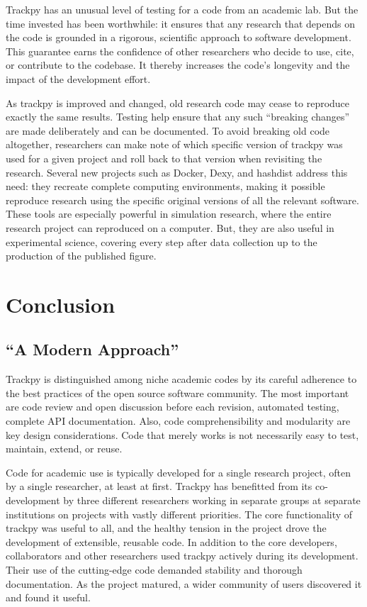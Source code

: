 Trackpy has an unusual level of testing for a code from an academic lab. But the time invested has been worthwhile: it ensures that any research that depends on the code is grounded in a rigorous, scientific approach to software development. This guarantee earns the confidence of other researchers who decide to use, cite, or contribute to the codebase. It thereby increases the code's longevity and the impact of the development effort.

As trackpy is improved and changed, old research code may cease to reproduce exactly the same results. Testing help ensure that any such ``breaking changes'' are made deliberately and can be documented. To avoid breaking old code altogether, researchers can make note of which specific version of trackpy was used for a given project and roll back to that version when revisiting the research. Several new projects such as Docker, Dexy, and hashdist address this need: they recreate complete computing environments, making it possible reproduce research using the specific original versions of all the relevant software. These tools are especially powerful in simulation research, where the entire research project can reproduced on a computer. But, they are also useful in experimental science, covering every step after data collection up to the production of the published figure.

\section{Conclusion}
\subsection{``A Modern Approach''}
Trackpy is distinguished among niche academic codes by its careful adherence to the best practices of the open source software community\cite{Wilson2014a}. The most important are code review and open discussion before each revision, automated testing, complete API documentation. Also, code comprehensibility and modularity are key design considerations. Code that merely works is not necessarily easy to test, maintain, extend, or reuse.

Code for academic use is typically developed for a single research project, often by a single researcher, at least at first. Trackpy has benefitted from its co-development by three different researchers working in separate groups at separate institutions on projects with vastly different priorities. The core functionality of trackpy was useful to all, and the healthy tension in the project drove the development of extensible, reusable code. In addition to the core developers, collaborators and other researchers used trackpy actively during its development. Their use of the cutting-edge code demanded stability and thorough documentation. As the project matured, a wider community of users discovered it and found it useful.

